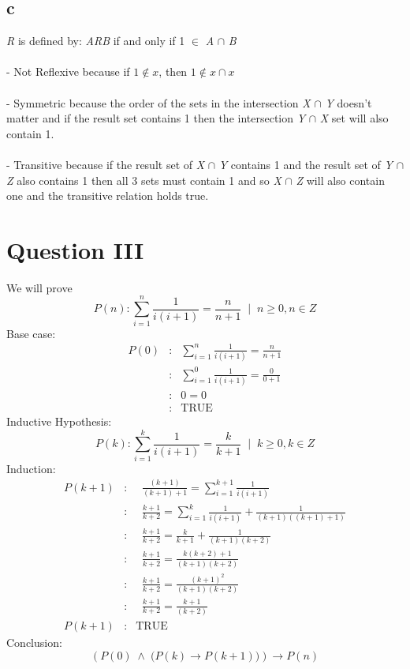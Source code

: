 \documentclass{article}
\begin{document}
\subsection*{c}
\textit{R} is defined by: \textit{ARB} if and only if 1 $\in$ \textit{A} $\cap$ \textit{B} 
\\\\  - Not Reflexive because if $1 \not \in x$, then $1 \not \in x \cap x$
\\\\  - Symmetric because the order of the sets in the intersection \textit{X} $\cap$ \textit{Y} doesn't matter and if the result set contains 1 then the intersection \textit{Y} $\cap$ \textit{X} set will also contain 1.
\\\\  - Transitive because if the result set of \textit{X} $\cap$ \textit{Y} contains 1 and the result set of \textit{Y} $\cap$ \textit{Z} also contains 1 then all 3 sets must contain 1 and so \textit{X} $\cap$ \textit{Z} will also contain one and the transitive relation holds true.

\section*{Question III}
We will prove
$$
P(n) \colon \sum^n_{i=1} \frac{1}{i(i+1)} = \frac{n}{n+1} \;\; \biggr | \;\; n \geq 0, n \in Z
$$
Base case:
\begin{eqnarray*}
P(0) &\colon& \sum^n_{i=1} \frac{1}{i(i+1)} = \frac{n}{n+1} \\
&\colon& \sum^0_{i=1} \frac{1}{i(i+1)} = \frac{0}{0+1} \\
&\colon& 0 = 0 \\
&\colon& \textrm{TRUE}
\end{eqnarray*}
Inductive Hypothesis:
$$
P(k) \colon \sum^k_{i=1} \frac{1}{i(i+1)} = \frac{k}{k+1} \;\; \biggr | \;\; k \geq 0, k \in Z
$$
Induction:
\begin{eqnarray*}
P(k+1) &\colon& \;\; \frac{(k+1)}{(k+1)+1} = \sum^{k+1}_{i=1} \frac{1}{i(i+1)}  \\
&\colon& \;\; \frac{k+1}{k+2} = \sum^k_{i=1} \frac{1}{i(i+1)} + \frac{1}{(k+1)((k+1)+1)} \\
&\colon& \;\; \frac{k+1}{k+2} = \frac{k}{k+1} + \frac{1}{(k+1)(k+2)} \\ 
&\colon& \;\; \frac{k+1}{k+2} = \frac{k(k+2) + 1}{(k+1)(k+2)} \\ 
&\colon& \;\; \frac{k+1}{k+2} = \frac{(k+1)^2}{(k+1)(k+2)} \\
&\colon& \;\; \frac{k+1}{k+2} = \frac{k+1}{(k+2)} \\
P(k+1) &\colon& \textrm{TRUE}
\end{eqnarray*}
Conclusion:
$$
\left (  P(0) \; \land \; \biggr ( P(k) \rightarrow P(k+1) \biggr ) \right ) \rightarrow P(n) 
$$
\end{document}

